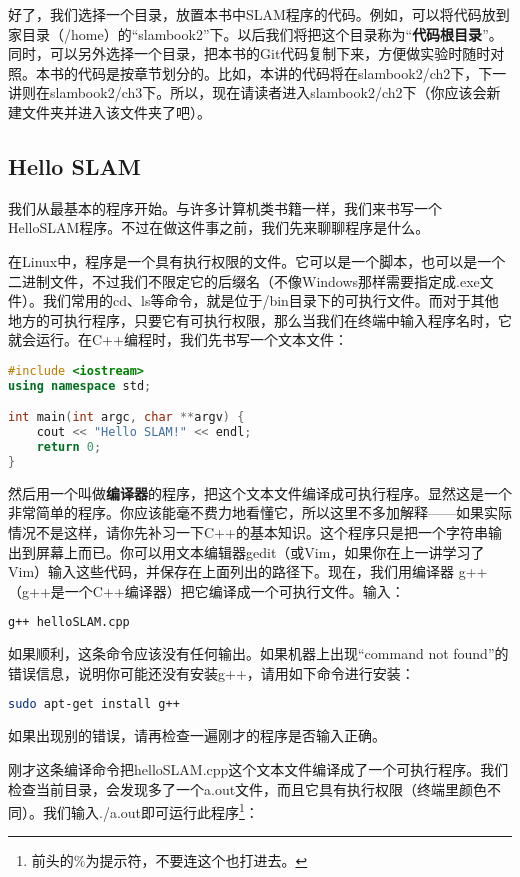 好了，我们选择一个目录，放置本书中SLAM程序的代码。例如，可以将代码放到家目录（/home）的“slambook2”下。以后我们将把这个目录称为“\textbf{代码根目录}”。同时，可以另外选择一个目录，把本书的Git代码复制下来，方便做实验时随时对照。本书的代码是按章节划分的。比如，本讲的代码将在slambook2/ch2下，下一讲则在slambook2/ch3下。所以，现在请读者进入slambook2/ch2下（你应该会新建文件夹并进入该文件夹\mbox{了吧）。}

\subsection{Hello SLAM}
我们从最基本的程序开始。与许多计算机类书籍一样，我们来书写一个HelloSLAM程序。不过在做这件事之前，我们先来聊聊程序是什么。

在Linux中，程序是一个具有执行权限的文件。它可以是一个脚本，也可以是一个二进制文件，不过我们不限定它的后缀名（不像Windows那样需要指定成.exe文件）。我们常用的cd、ls等命令，就是位于/bin目录下的可执行文件。而对于其他地方的可执行程序，只要它有可执行权限，那么当我们在终端中输入程序名时，它就会运行。在C++编程时，我们先书写一个文本文件：

\begin{lstlisting}[language=C++,caption=slambook2/ch2/helloSLAM.cpp]
#include <iostream>
using namespace std;

int main(int argc, char **argv) {
	cout << "Hello SLAM!" << endl;
	return 0;
}
\end{lstlisting}

然后用一个叫做\textbf{编译器}的程序，把这个文本文件编译成可执行程序。显然这是一个非常简单的程序。你应该能毫不费力地看懂它，所以这里不多加解释——如果实际情况不是这样，请你先补习一下C++的基本知识。这个程序只是把一个字符串输出到屏幕上而已。你可以用文本编辑器gedit（或Vim，如果你在上一讲学习了Vim）输入这些代码，并保存在上面列出的路径下。现在，我们用编译器 g++ （g++是一个C++编译器）把它编译成一个可执行文件。输入：

\begin{lstlisting}[language=sh,caption=终端输入：]
g++ helloSLAM.cpp
\end{lstlisting}

如果顺利，这条命令应该没有任何输出。如果机器上出现“command not found”的错误信息，说明你可能还没有安装g++，请用如下命令进行安装：
\begin{lstlisting}[language=sh,caption=终端输入：]
sudo apt-get install g++
\end{lstlisting}
如果出现别的错误，请再检查一遍刚才的程序是否输入正确。

刚才这条编译命令把helloSLAM.cpp这个文本文件编译成了一个可执行程序。我们检查当前目录，会发现多了一个a.out文件，而且它具有执行权限（终端里颜色不同）。我们输入./a.out即可运行此程序\footnote{前头的\%为提示符，不要连这个也打进去。}：


